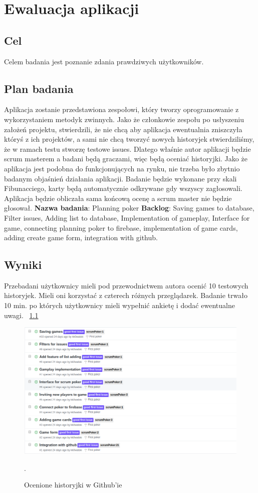 \chapter{Ewaluacja aplikacji}

\section{Cel}

Celem badania jest poznanie zdania prawdziwych użytkowników.

\section{Plan badania}

Aplikacja zostanie przedstawiona zespołowi,
który tworzy oprogramowanie z wykorzystaniem metodyk zwinnych.
Jako że członkowie zespołu po usłyszeniu założeń projektu, stwierdzili,
że nie chcą aby aplikacja ewentualnia zniszczyła któryś z ich projektów,
a sami nie chcą tworzyć nowych historyjek stwierdziliśmy,
że w ramach testu stworzę testowe issues.
Dlatego właśnie autor aplikacji będzie scrum masterem a badani będą graczami,
więc będą oceniać historyjki.
Jako że aplikacja jest podobna do funkcjonujących na rynku,
nie trzeba było zbytnio badanym objaśnień działania aplikacji.
Badanie będzie wykonane przy skali Fibunacciego,
karty będą automatycznie odkrywane gdy wszyscy zagłosowali.
 Aplikacja będzie obliczała sama końcową ocenę a scrum master nie będzie głosował.
 \textbf{Nazwa badania}: Planning poker
 \textbf{Backlog}: Saving games to database, Filter issues, Adding list to database,
 Implementation of gameplay, Interface for game, connecting planning poker to firebase,
implementation of game cards, adding create game form, integration with github.

\section{Wyniki}

Przebadani użytkownicy mieli pod przewodnictwem autora ocenić 10 testowych historyjek.
Mieli oni korzystać z czterech różnych przeglądarek.
Badanie trwało 10 min. po których użytkownicy mieli wypełnić ankietę i dodać ewentualne uwagi.
~\ref{rys:wynikBadania}
\begin{figure}
	\centering\includegraphics[width=.9\textwidth]{img/wynikBadania}
	\caption{Ocenione historyjki w Github'ie}.
	\label{rys:wynikBadania}
\end{figure}

